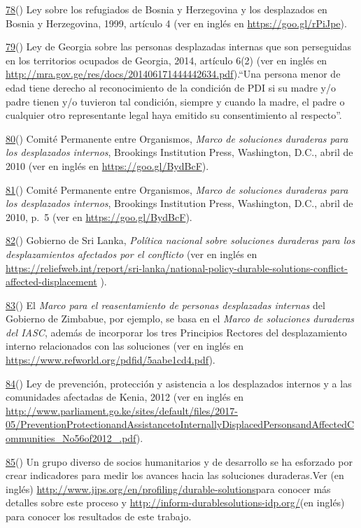 \documentclass[
]{book}
\begin{document}
\protect\hyperlink{sdfootnote78anc}{78}() Ley sobre los refugiados de Bosnia y Herzegovina y los desplazados en Bosnia y Herzegovina, 1999, artículo 4 (ver en inglés en \url{https://goo.gl/rPiJpe}).

\protect\hyperlink{sdfootnote79anc}{79}() Ley de Georgia sobre las personas desplazadas internas que son perseguidas en los territorios ocupados de Georgia, 2014, artículo 6(2) (ver en inglés en \url{http://mra.gov.ge/res/docs/201406171444442634.pdf}).``Una persona menor de edad tiene derecho al reconocimiento de la condición de PDI si su madre y/o padre tienen y/o tuvieron tal condición, siempre y cuando la madre, el padre o cualquier otro representante legal haya emitido su consentimiento al respecto''.

\protect\hyperlink{sdfootnote80anc}{80}() Comité Permanente entre Organismos, \emph{Marco de soluciones duraderas para los desplazados internos}, Brookings Institution Press, Washington, D.C., abril de 2010 (ver en inglés en \url{https://goo.gl/BydBcF}).

\protect\hyperlink{sdfootnote81anc}{81}() Comité Permanente entre Organismos, \emph{Marco de soluciones duraderas para los desplazados internos}, Brookings Institution Press, Washington, D.C., abril de 2010, p.~5 (ver en \url{https://goo.gl/BydBcF}).

\protect\hyperlink{sdfootnote82anc}{82}() Gobierno de Sri Lanka, \emph{Política nacional sobre soluciones duraderas para los desplazamientos afectados por el conflicto} (ver en inglés en \url{https://reliefweb.int/report/sri-lanka/national-policy-durable-solutions-conflict-affected-displacement} ).

\protect\hyperlink{sdfootnote83anc}{83}() El \emph{Marco para el reasentamiento de personas desplazadas internas} del Gobierno de Zimbabue, por ejemplo, se basa en el \emph{Marco de soluciones duraderas del IASC}, además de incorporar los tres Principios Rectores del desplazamiento interno relacionados con las soluciones (ver en inglés en \url{https://www.refworld.org/pdfid/5aabe1cd4.pdf}).

\protect\hyperlink{sdfootnote84anc}{84}() Ley de prevención, protección y asistencia a los desplazados internos y a las comunidades afectadas de Kenia, 2012 (ver en inglés en \url{http://www.parliament.go.ke/sites/default/files/2017-05/PreventionProtectionandAssistancetoInternallyDisplacedPersonsandAffectedCommunities_No56of2012_.pdf}).

\protect\hyperlink{sdfootnote85anc}{85}() Un grupo diverso de socios humanitarios y de desarrollo se ha esforzado por crear indicadores para medir los avances hacia las soluciones duraderas.Ver (en inglés) \url{http://www.jips.org/en/profiling/durable-solutions}para conocer más detalles sobre este proceso y \url{http://inform-durablesolutions-idp.org/}(en inglés) para conocer los resultados de este trabajo.
\end{document}
